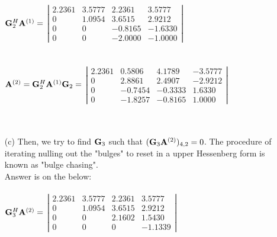 \documentclass[english,onecolumn]{IEEEtran}
\newcommand{\bA}{{\bf A}}
\newcommand{\bG}{{\bf G}}
\begin{document}
\begin{enumerate}
    $\bG_2^{H}\bA^{(1)}=$
    $\left|\begin{array}{rrrr}2.2361 & 3.5777 & 2.2361 & 3.5777 \\ 0 & 1.0954 & 3.6515 & 2.9212 \\ 0 & 0 & -0.8165 & -1.6330 \\ 0 & 0 & -2.0000 & -1.0000\end{array}\right|$\\\\\\
    
    $\bA^{(2)}  = \bG_2^{H} \bA^{(1)} \bG_2=$
    $\left|\begin{array}{rrrr}2.2361 & 0.5806 & 4.1789 & -3.5777 \\ 0 & 2.8861 & 2.4907 & -2.9212 \\ 0 & -0.7454 & -0.3333 & 1.6330 \\ 0 & -1.8257 & -0.8165 & 1.0000\end{array}\right|$\\\\\\
    
    
    
    
    
    
    \item[(c)] Then, we try to find $\bG_3$ such that $(\bG_3\bA^{(2)})_{4,2}=0$.
    The procedure of iterating nulling out the "bulges" to reset in a upper Hessenberg form is known as "bulge chasing".\\
    Answer is on the below:\\\\
    $\bG_3^{H}\bA^{(2)}=$
    $\left|\begin{array}{rrrr}2.2361 & 3.5777 & 2.2361 & 3.5777 \\ 0 & 1.0954 & 3.6515 & 2.9212 \\ 0 & 0 & 2.1602 & 1.5430 \\ 0 & 0 & 0 & -1.1339\end{array}\right|$\\\\\\    
    
    
    
\end{enumerate}
\end{document}
